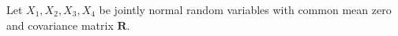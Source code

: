 Let $X_1, X_2, X_3, X_4$ be jointly normal random variables with common mean zero and covariance matrix $\mathbf{R}$.
